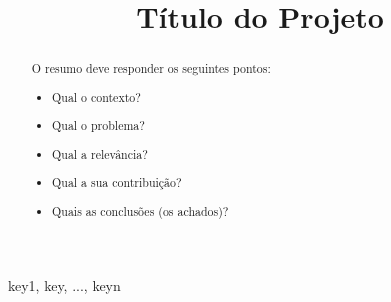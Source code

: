 \documentclass[conference]{IEEEtran}
\begin{document}
\title{Título do Projeto}

\author{
\and
{}
\and
{}
}

\maketitle

\begin{abstract}
O resumo deve responder os seguintes pontos:
\begin{itemize}
    \item Qual o contexto?
    \item Qual o problema?
    \item Qual a relevância?
    \item Qual a sua contribuição?
    \item Quais as conclusões (os achados)?
\end{itemize}
\end{abstract}

\begin{IEEEkeywords}
key1, key, ..., keyn
\end{IEEEkeywords}





\end{document}
